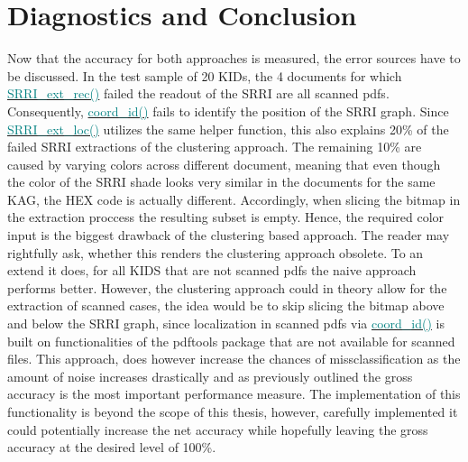 \documentclass[aodsor,preprint]{imsart}
\numberwithin{equation}{section}
\theoremstyle{plain}
\begin{document}
\section{Diagnostics and Conclusion}
Now that the accuracy for both approaches is measured, the error sources have to be discussed. In the test sample of 20 KIDs, the 4 documents for which \href{https://github.com/Base-R-Best-R/KID/blob/main/Code/Package/KIDs/R/SRRI_ext_rec.R}{\textcolor{teal}{SRRI\_ext\_rec()}} failed the readout of the SRRI are all scanned pdfs. Consequently, \href{https://github.com/Base-R-Best-R/KID/blob/main/Code/Package/KIDs/R/coord_id.R}{\textcolor{teal}{coord\_id()}} fails to identify the position of the SRRI graph. Since \href{https://github.com/Base-R-Best-R/KID/blob/main/Code/Package/KIDs/R/SRRI_ext_loc.R}{\textcolor{teal}{SRRI\_ext\_loc()}} utilizes the same helper function, this also explains 20\% of the failed SRRI extractions of the clustering approach. The remaining 10\% are caused by varying colors across different document, meaning that even though the color of the SRRI shade looks very similar in the documents for the same KAG, the HEX code is actually different. Accordingly, when slicing the bitmap in the extraction proccess the resulting subset is empty. Hence, the required color input is the biggest drawback of the clustering based approach. The reader may rightfully ask, whether this renders the clustering approach obsolete. To an extend it does, for all KIDS that are not scanned pdfs the naive approach performs better. However, the clustering approach could in theory allow for the extraction of scanned cases, the idea would be to skip slicing the bitmap above and below the SRRI graph, since localization in scanned pdfs via \href{https://github.com/Base-R-Best-R/KID/blob/main/Code/Package/KIDs/R/coord_id.R}{\textcolor{teal}{coord\_id()}} is built on functionalities of the pdftools package that are not available for scanned files. This approach, does however increase the chances of missclassification as the amount of noise increases drastically and as previously outlined the gross accuracy is the most important performance measure. The implementation of this functionality is beyond the scope of this thesis, however, carefully implemented it could potentially increase the net accuracy while hopefully leaving the gross accuracy at the desired level of 100\%.



\appendix








\newpage
\printbibliography
\end{document}
